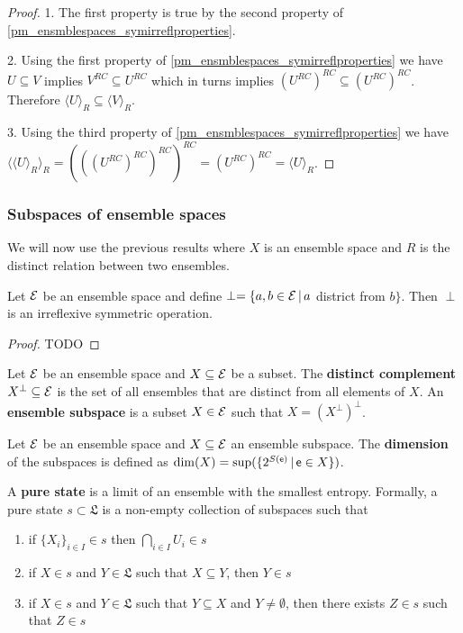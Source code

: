 \begin{proof}
	1. The first property is true by the second property of \ref{pm_ensmblespaces_symirreflproperties}.
	
	2. Using the first property of \ref{pm_ensmblespaces_symirreflproperties} we have $U \subseteq V$ implies $V^{RC} \subseteq U^{RC}$ which in turns implies $(U^{RC})^{RC} \subseteq (U^{RC})^{RC}$. Therefore $\langle U \rangle_R \subseteq \langle V \rangle_R$.
	
	3. Using the third property of \ref{pm_ensmblespaces_symirreflproperties} we have $\langle \langle U \rangle_R \rangle_R = (((U^{RC})^{RC})^{RC})^{RC} = (U^{RC})^{RC} = \langle U \rangle_R$.
\end{proof}

\subsubsection{Subspaces of ensemble spaces}

We will now use the previous results where $X$ is an ensemble space and $R$ is the distinct relation between two ensembles.

\begin{prop}
	Let $\mathcal{E}$ be an ensemble space and define $\perp = \{ a,b \in \mathcal{E} \, | \, a $ district from $b \}$. Then $\perp$ is an irreflexive symmetric operation.
\end{prop}

\begin{proof}
	TODO
\end{proof}

\begin{defn}
	Let $\mathcal{E}$ be an ensemble space and $X \subseteq \mathcal{E}$ be a subset. The \textbf{distinct complement} $X^\perp \subseteq \mathcal{E}$ is the set of all ensembles that are distinct from all elements of $X$. An \textbf{ensemble subspace} is a subset $X \in \mathcal{E}$ such that $X = (X^\perp)^\perp$.
\end{defn}


\begin{defn}
	Let $\mathcal{E}$ be an ensemble space and $X \subseteq \mathcal{E}$ an ensemble subspace. The \textbf{dimension} of the subspaces is defined as $\dim(X) = \sup(\{2^{S(\mathsf{e})} \, | \, \mathsf{e} \in X\})$.
\end{defn}

\begin{defn}
	A \textbf{pure state} is a limit of an ensemble with the smallest entropy. Formally, a pure state $s \subset \mathfrak{L}$ is a non-empty collection of subspaces such that
	\begin{enumerate}
		\item if $\{X_i\}_{i \in I} \in s$ then $\bigcap_{i \in I} U_i \in s$
		\item if $X \in s$ and $Y \in \mathfrak{L}$ such that $X \subseteq Y$, then $Y \in s$
		\item if $X \in s$ and $Y \in \mathfrak{L}$ such that $Y \subseteq X$ and $Y \neq \emptyset$, then there exists $Z \in s$ such that $Z \in s$
	\end{enumerate}
\end{defn}

